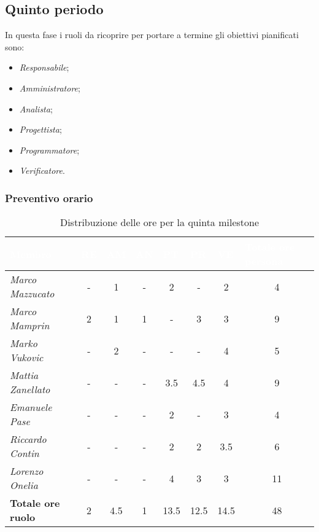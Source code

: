 \subsection{Quinto periodo}

In questa fase i ruoli da ricoprire per portare a termine gli obiettivi pianificati sono:
\begin{itemize}
    \item \textit{Responsabile};
    \item \textit{Amministratore};
    \item \textit{Analista};
    \item \textit{Progettista};
    \item \textit{Programmatore};
    \item \textit{Verificatore}.
\end{itemize}

\subsubsection{Preventivo orario}

\begin{table}[H]
    \renewcommand\arraystretch{1.5}
    \centering
    \begin{tabular}{|l|c|c|c|c|c|c|c|}
    \hline
    \rowcolor[HTML]{036400}
    \textcolor{white}{\textbf{Membro}} & \multicolumn{1}{l|}{\textcolor{white}{\textbf{RE}}} & \multicolumn{1}{l|}{\textcolor{white}{\textbf{AM}}} & \multicolumn{1}{l|}{\textcolor{white}{\textbf{AN}}} & \multicolumn{1}{l|}{\textcolor{white}{\textbf{PT}}} & \multicolumn{1}{l|}{\textcolor{white}{\textbf{PR}}} & \multicolumn{1}{l|}{\textcolor{white}{\textbf{VE}}} & \multicolumn{1}{l|}{\textcolor{white}{\textbf{Totale ore persona}}} \\ \hline
    \rowcolor[HTML]{EFEFEF}\textit{Marco Mazzucato}  & - & 1   & -     & 2    & -    & 2    & 4     \\ \hline
    \rowcolor[HTML]{C0C0C0}\textit{Marco Mamprin}    & 2 & 1   & 1     & -    & 3    & 3    & 9     \\ \hline
    \rowcolor[HTML]{EFEFEF}\textit{Marko Vukovic}    & - & 2   & -     & -    & -    & 4    & 5     \\ \hline
    \rowcolor[HTML]{C0C0C0}\textit{Mattia Zanellato} & - & -   & -     & 3.5  & 4.5  & 4    & 9     \\ \hline
    \rowcolor[HTML]{EFEFEF}\textit{Emanuele Pase}    & - & -   & -     & 2    & -    & 3    & 4     \\ \hline
    \rowcolor[HTML]{C0C0C0}\textit{Riccardo Contin}  & - & -   & -     & 2    & 2    & 3.5  & 6     \\ \hline
    \rowcolor[HTML]{EFEFEF}\textit{Lorenzo Onelia}   & - & -   & -     & 4    & 3    & 3    & 11    \\ \hline
    \rowcolor[HTML]{C0C0C0}\textbf{Totale ore ruolo} & 2 & 4.5 & 1     & 13.5 & 12.5 & 14.5 & 48    \\ \hline
    \end{tabular}
    \caption{Distribuzione delle ore per la quinta milestone}
\end{table}

